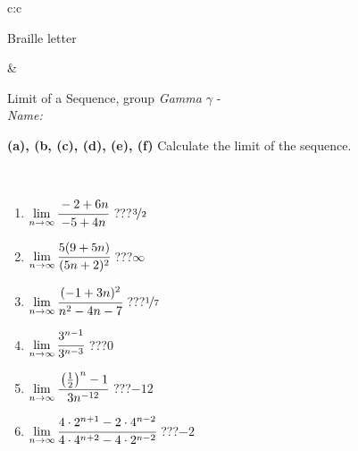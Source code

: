 \documentclass[10pt]{report}
\begin{document}
\begin{tabular}{c:c}
\begin{minipage}[c][104.5mm][t]{0.5\linewidth}
\begin{center}
\begin{minipage}{0.20\linewidth}
\begin{center}
{\small Braille letter}
\end{center}
\end{minipage}
\end{center}
\end{minipage}
&
\begin{minipage}[c][104.5mm][t]{0.5\linewidth}
\begin{center}
\vspace{5mm}
{\huge Limit of a Sequence, group \textit{Gamma $\gamma$} -}\\[5mm]
\textit{Name:}\phantom{xxxxxxxxxxxxxxxxxxxxxxxxxxxxxxxxxxxxxxxxxxxxxxxxxxxxxxxxxxxxxxxxx}\\[5mm]
\begin{minipage}{0.95\linewidth}
\begin{center}
{
\textbf{(a), (b, (c), (d), (e), (f)} Calculate the limit of the sequence. \\[-1mm]
\phantom{x}
}
\end{center}
\end{minipage}
\\[1mm]
\begin{minipage}{0.79\linewidth}
\begin{center}
\begin{varwidth}{\linewidth}
\setlength{\itemsep}{0pt}
\begin{enumerate}
\normalsize
\item $\lim\limits_{n\to\infty}\cfrac{-2+6n}{-5+4n}$\quad \dotfill\; ???\;\dotfill \quad $\nicefrac{3}{2}$
\item $\lim\limits_{n\to\infty}\cfrac{5(9+5n)}{(5n+2)^2}$\quad \dotfill\; ???\;\dotfill \quad $\infty$
\item $\lim\limits_{n\to\infty}\cfrac{(-1+3n)^2}{n^2-4n-7}$\quad \dotfill\; ???\;\dotfill \quad $\nicefrac{1}{7}$
\item $\lim\limits_{n\to\infty}\cfrac{3^{n-1}}{3^{n-3}}$\quad \dotfill\; ???\;\dotfill \quad $0$
\item $\lim\limits_{n\to\infty}\cfrac{\left(\frac{1}{2}\right)^n -1}{3n^{-12}}$\quad \dotfill\; ???\;\dotfill \quad $-12$
\item $\lim\limits_{n\to\infty}\cfrac{4\cdot 2^{n+1}-2\cdot 4^{n-2}}{4\cdot 4^{n+2}-4\cdot 2^{n-2}}$\quad \dotfill\; ???\;\dotfill \quad $-2$
\end{enumerate}
\end{varwidth}
\end{center}
\end{minipage}
\begin{minipage}{0.20\linewidth}

\end{minipage}
\end{center}
\end{minipage}
\end{tabular}
\end{document}
